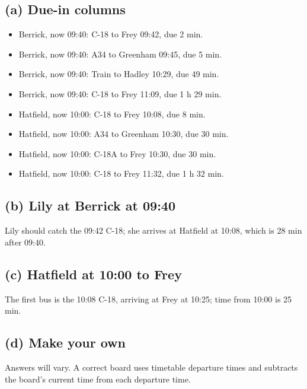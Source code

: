 \documentclass[11pt,a4paper]{article}
\begin{document}
\subsection*{(a) Due-in columns}
\begin{itemize}[leftmargin=*]
\item Berrick, now 09:40: C-18 to Frey 09:42, due 2 min.
\item Berrick, now 09:40: A34 to Greenham 09:45, due 5 min.
\item Berrick, now 09:40: Train to Hadley 10:29, due 49 min.
\item Berrick, now 09:40: C-18 to Frey 11:09, due 1 h 29 min.
\item Hatfield, now 10:00: C-18 to Frey 10:08, due 8 min.
\item Hatfield, now 10:00: A34 to Greenham 10:30, due 30 min.
\item Hatfield, now 10:00: C-18A to Frey 10:30, due 30 min.
\item Hatfield, now 10:00: C-18 to Frey 11:32, due 1 h 32 min.
\end{itemize}

\subsection*{(b) Lily at Berrick at 09:40}
Lily should catch the 09:42 C-18; she arrives at Hatfield at 10:08, which is 28 min after 09:40.

\subsection*{(c) Hatfield at 10:00 to Frey}
The first bus is the 10:08 C-18, arriving at Frey at 10:25; time from 10:00 is 25 min.

\subsection*{(d) Make your own}
Answers will vary. A correct board uses timetable departure times and subtracts the board's current time from each departure time.
\end{document}
